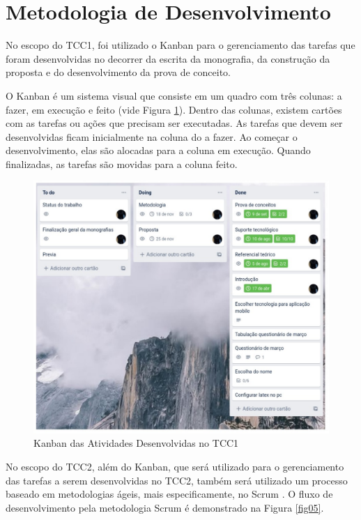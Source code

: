 \section{Metodologia de Desenvolvimento}

No escopo do TCC1, foi utilizado o Kanban para o gerenciamento das tarefas que foram 
desenvolvidas no decorrer da escrita da monografia, da construção da proposta e do desenvolvimento 
da prova de conceito.

O Kanban é um sistema visual que consiste em um quadro com três colunas: a fazer, em execução e feito (vide Figura \ref{fig04}). 
Dentro das colunas, existem cartões com as tarefas ou ações que precisam ser executadas. As tarefas que devem 
ser desenvolvidas ficam inicialmente na coluna do a fazer. Ao começar o desenvolvimento, elas são alocadas para a coluna 
em execução. Quando finalizadas, as tarefas são movidas para a coluna feito.

\begin{figure}[ht]
	\centering
	\includegraphics[keepaspectratio=true,scale=0.6]{figuras/kanban.pdf}
	\caption{Kanban das Atividades Desenvolvidas no TCC1 }
        \label{fig04}
\end{figure}

No escopo do TCC2, além do Kanban, que será utilizado para o gerenciamento das tarefas a serem desenvolvidas no TCC2,
também será utilizado um processo baseado em metodologias ágeis, mais especificamente, no Scrum \cite{scrum2017}. O fluxo de desenvolvimento 
pela metodologia Scrum é demonstrado na Figura \ref{fig05}.


